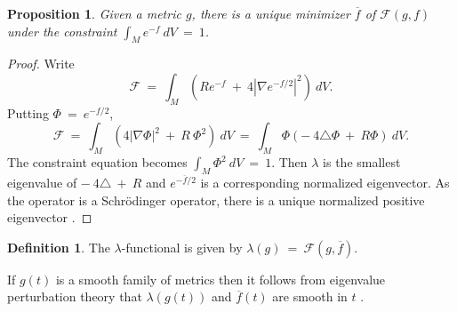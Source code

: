 \documentclass[12pt]{amsart}
\numberwithin{equation}{section}
\theoremstyle{plain}
\newtheorem{proposition}[equation]{Proposition}
\theoremstyle{definition}
\newtheorem{definition}[equation]{Definition}
\theoremstyle{remark}
\begin{document}
\begin{proposition}
Given a metric $g$, there is a unique minimizer 
$\overline{f}$ of ${\mathcal F}(g, f)$ under the constraint
$\int_M e^{-f} \: dV \: = \: 1$. 
\end{proposition}
\begin{proof}
Write
\begin{equation}
{\mathcal F} \: = \: \int_M \left( R e^{-f} \: + \: 4 |\nabla e^{-f/2}|^2
\right) \: dV.
\end{equation}
Putting $\Phi \: = \: e^{- f/2}$,
\begin{equation}
{\mathcal F} \: = \: \int_M \left( 4 |\nabla \Phi|^2 \: + \: R \: \Phi^2
\right) \: dV \: = \:
\int_M \Phi \left( - \: 4 \triangle \Phi \: + \: R \Phi
\right) \: dV. 
\end{equation}
The constraint equation becomes $\int_M \Phi^2 \: dV \: = \: 1$.
Then $\lambda$ is the smallest eigenvalue of
$- \: 4 \triangle \: + \: R$ and $e^{-\overline{f}/2}$ 
is a corresponding normalized
eigenvector.  As the operator is a Schr\"odinger operator, there is a
unique normalized positive eigenvector \cite[Chapter XIII.12]{Reed-Simon}.
\end{proof}

\begin{definition}
The $\lambda$-functional is given by
$\lambda(g) \: =\: {\mathcal F}(g, \overline{f})$.
\end{definition}

If $g(t)$ is a smooth family of metrics then it follows from eigenvalue
perturbation theory that $\lambda(g(t))$ and $\overline{f}(t)$ are
smooth in $t$ \cite[Chapter XII]{Reed-Simon}.
\end{document}
